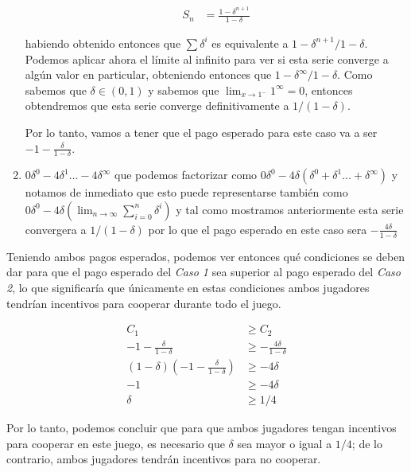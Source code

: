 \documentclass[11pt]{article}
\begin{document}
\begin{flushleft}
\begin{enumerate}[label=\textbf{Caso \arabic*.}]
\begin{minipage}{0.5\textwidth}
\begin{align*}
            S_n&=\frac{1-\delta^{n+1}}{1-\delta}
        \end{align*}
        \end{minipage}
        \begin{minipage}{0.4\textwidth}
            habiendo obtenido entonces que $\sum \delta^i$ es equivalente a $1-\delta^{n+1}/1-\delta$. Podemos aplicar ahora el límite al infinito para ver si esta serie converge a algún valor en particular, obteniendo entonces que $1-\delta^\infty/1-\delta$. Como sabemos que $\delta\in(0,1)$ y sabemos que $\lim_{x\to1^-} 1^\infty=0$, entonces obtendremos que esta serie converge definitivamente a $1/(1-\delta)$.
        \end{minipage}
         Por lo tanto, vamos a tener que el pago esperado para este caso va a ser $-1-\frac{\delta}{1-\delta}$.\\

        

        \item $0\delta^0-4\delta^1\dots-4\delta^\infty$ que podemos factorizar como $0\delta^0-4\delta(\delta^0+\delta^1\dots+\delta^\infty)$ y notamos de inmediato que esto puede representarse también como $0\delta^0-4\delta\left(\lim_{n\to\infty} \sum_{i=0}^n \delta^i\right)$ y tal como mostramos anteriormente esta serie convergera a $1/(1-\delta)$ por lo que el pago esperado en este caso sera $-\frac{4\delta}{1-\delta}$
    \end{enumerate}

    Teniendo ambos pagos esperados, podemos ver entonces qué condiciones se deben dar para que el pago esperado del \textit{Caso 1} sea superior al pago esperado del \textit{Caso 2}, lo que significaría que únicamente en estas condiciones ambos jugadores tendrían incentivos para cooperar durante todo el juego.
    
    \begin{minipage}{0.4\textwidth}
        \begin{align*}
            C_1 &\geq C_2\\
            -1-\frac{\delta}{1-\delta} &\geq -\frac{4\delta}{1-\delta}\\
            (1-\delta)\left(-1-\frac{\delta}{1-\delta}\right) &\geq -4\delta\\
            -1 &\geq -4\delta\\
            \delta &\geq 1/4
        \end{align*}
    \end{minipage}
    \begin{minipage}{0.5\textwidth}
        Por lo tanto, podemos concluir que para que ambos jugadores tengan incentivos para cooperar en este juego, es necesario que $\delta$ sea mayor o igual a $1/4$; de lo contrario, ambos jugadores tendrán incentivos para no cooperar.
    \end{minipage}
    

    
\end{flushleft}
\end{document}

